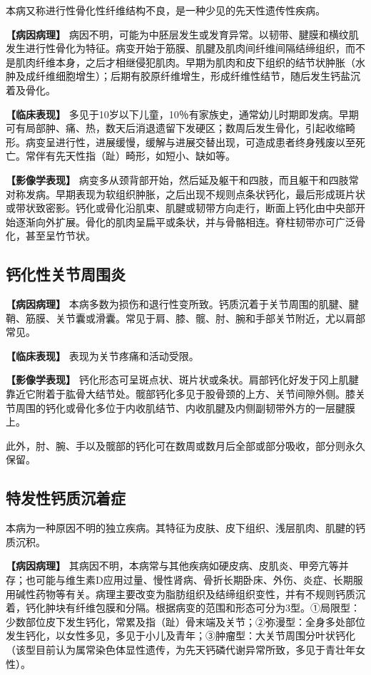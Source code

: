 本病又称进行性骨化性纤维结构不良，是一种少见的先天性遗传性疾病。

\textbf{【病因病理】}
病因不明，可能为中胚层发生或发育异常。以韧带、腱膜和横纹肌发生进行性骨化为特征。病变开始于筋膜、肌腱及肌肉间纤维间隔结缔组织，而不是肌肉纤维本身，之后才相继侵犯肌肉。早期为肌肉和皮下组织的结节状肿胀（水肿及成纤维细胞增生）；后期有胶原纤维增生，形成纤维性结节，随后发生钙盐沉着及骨化。

\textbf{【临床表现】}
多见于10岁以下儿童，10％有家族史，通常幼儿时期即发病。早期可有局部肿、痛、热，数天后消退遗留下发硬区；数周后发生骨化，引起收缩畸形。病变呈进行性，进展缓慢，缓解与进展交替出现，可造成患者终身残废以至死亡。常伴有先天性指（趾）畸形，如短小、缺如等。

\textbf{【影像学表现】}
病变多从颈背部开始，然后延及躯干和四肢，而且躯干和四肢常对称发病。早期表现为软组织肿胀，之后出现不规则点条状钙化，最后形成斑片状或带状致密影。钙化或骨化沿肌束、肌腱或韧带方向走行，断面上钙化由中央部开始逐渐向外扩展。骨化的肌肉呈扁平或条状，并与骨骼相连。脊柱韧带亦可广泛骨化，甚至呈竹节状。

\subsection{钙化性关节周围炎}

\textbf{【病因病理】}
本病多数为损伤和退行性变所致。钙质沉着于关节周围的肌腱、腱鞘、筋膜、关节囊或滑囊。常见于肩、膝、髋、肘、腕和手部关节附近，尤以肩部常见。

\textbf{【临床表现】} 表现为关节疼痛和活动受限。

\textbf{【影像学表现】}
钙化形态可呈斑点状、斑片状或条状。肩部钙化好发于冈上肌腱靠近它附着于肱骨大结节处。髋部钙化多见于股骨颈的上方、关节间隙外侧。膝关节周围的钙化或骨化多位于内收肌结节、内收肌腱及内侧副韧带外方的一层腱膜上。

此外，肘、腕、手以及髋部的钙化可在数周或数月后全部或部分吸收，部分则永久保留。

\subsection{特发性钙质沉着症}

本病为一种原因不明的独立疾病。其特征为皮肤、皮下组织、浅层肌肉、肌腱的钙质沉积。

\textbf{【病因病理】}
其病因不明，本病常与其他疾病如硬皮病、皮肌炎、甲旁亢等并存；也可能与维生素D应用过量、慢性肾病、骨折长期卧床、外伤、炎症、长期服用碱性药物等有关。病理主要改变为脂肪组织及结缔组织变性，并有不规则钙质沉着，钙化肿块有纤维包膜和分隔。根据病变的范围和形态可分为3型。①局限型：少数部位皮下发生钙化，常累及指（趾）骨末端及关节；②弥漫型：全身多处部位发生钙化，以女性多见，多见于小儿及青年；③肿瘤型：大关节周围分叶状钙化（该型目前认为属常染色体显性遗传，为先天钙磷代谢异常所致，多见于青壮年女性）。

